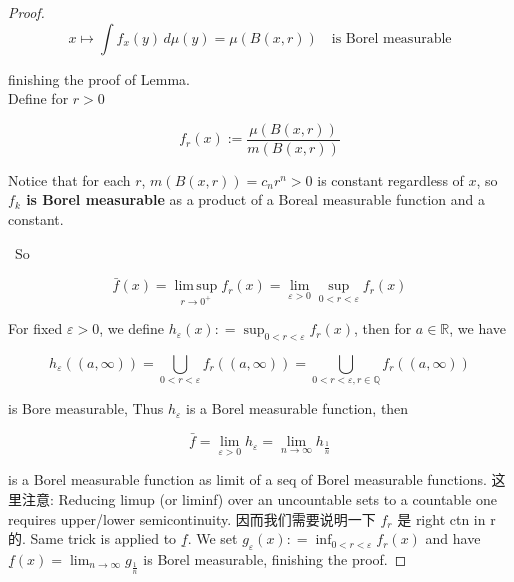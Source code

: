 \begin{proof}
\[x\mapsto\int f_{x}(y)\, d\mu(y) = \mu(B(x,r))\quad\text{is Borel measurable}\]

finishing the proof of Lemma.\\
Define for \(r > 0\)

\[f_{r}(x) := \frac{\mu(B\left( {x,r} \right))}{m(B\left( {x,r} \right))}\]

Notice that for each \(r\), \(m(B(x,r)) = c_{n}r^{n} > 0\) is constant regardless of \(x\), so \textbf{\(f_{k}\) is Borel measurable} as a product of a Boreal measurable function and a constant.\\
\strut ~So

\[\bar{f}(x) = \operatorname{lim\, sup}\limits_{r\rightarrow 0^{+}}f_{r}(x) = \lim\limits_{\varepsilon > 0}\sup\limits_{0 < r < \varepsilon}f_{r}(x)\]

For fixed \(\varepsilon > 0\), we define \(h_{\varepsilon}(x): = \sup_{0 < r < \varepsilon}f_{r}(x)\), then for \(a \in \mathbb{R}\), we have

\[h_{\varepsilon}((a,\infty)) = \bigcup\limits_{0 < r < \varepsilon}f_{r}((a,\infty)) = \bigcup\limits_{0 < r < \varepsilon,r \in \mathbb{Q}}f_{r}((a,\infty))\]

is Bore measurable, Thus \(h_{\varepsilon}\) is a Borel measurable function, then

\[\bar{f} = \lim\limits_{\varepsilon > 0}h_{\varepsilon} = \lim\limits_{n\rightarrow\infty}h_{\frac{1}{n}}\]

is a Borel measurable function as limit of a seq of Borel measurable functions. 这里注意: Reducing limup (or liminf) over an uncountable sets to a countable one requires upper/lower semicontinuity. 因而我们需要说明一下 \(f_{r}\) 是 right ctn in r 的. Same trick is applied to \(\underline{f}\). We set \(g_{\varepsilon}(x): = \inf_{0 < r < \varepsilon}f_{r}(x)\) and have \(\underline{f}(x) = \lim_{n\rightarrow\infty}g_{\frac{1}{n}}\) is Borel measurable, finishing the proof.

\end{proof}

